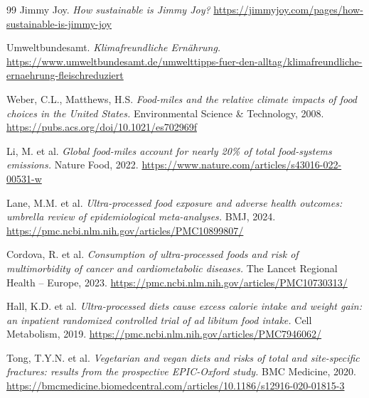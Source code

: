 \documentclass[11pt,a4paper]{article}
\begin{document}
\begin{thebibliography}{99}
 Jimmy Joy. \emph{How sustainable is Jimmy Joy?} \url{https://jimmyjoy.com/pages/how-sustainable-is-jimmy-joy}

 Umweltbundesamt. \emph{Klimafreundliche Ernährung.} \url{https://www.umweltbundesamt.de/umwelttipps-fuer-den-alltag/klimafreundliche-ernaehrung-fleischreduziert}

 Weber, C.L., Matthews, H.S. \emph{Food-miles and the relative climate impacts of food choices in the United States.} Environmental Science \& Technology, 2008. \url{https://pubs.acs.org/doi/10.1021/es702969f}

 Li, M. et al. \emph{Global food-miles account for nearly 20\% of total food-systems emissions.} Nature Food, 2022. \url{https://www.nature.com/articles/s43016-022-00531-w}

 Lane, M.M. et al. \emph{Ultra-processed food exposure and adverse health outcomes: umbrella review of epidemiological meta-analyses.} BMJ, 2024. \url{https://pmc.ncbi.nlm.nih.gov/articles/PMC10899807/}

 Cordova, R. et al. \emph{Consumption of ultra-processed foods and risk of multimorbidity of cancer and cardiometabolic diseases.} The Lancet Regional Health -- Europe, 2023. \url{https://pmc.ncbi.nlm.nih.gov/articles/PMC10730313/}

 Hall, K.D. et al. \emph{Ultra-processed diets cause excess calorie intake and weight gain: an inpatient randomized controlled trial of ad libitum food intake.} Cell Metabolism, 2019. \url{https://pmc.ncbi.nlm.nih.gov/articles/PMC7946062/}

 Tong, T.Y.N. et al. \emph{Vegetarian and vegan diets and risks of total and site-specific fractures: results from the prospective EPIC-Oxford study.} BMC Medicine, 2020. \url{https://bmcmedicine.biomedcentral.com/articles/10.1186/s12916-020-01815-3}

\end{thebibliography}
\end{document}
